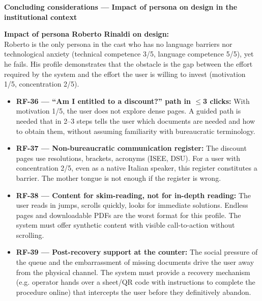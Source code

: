 ﻿\documentclass[11pt,a4paper]{article}
\begin{document}
\begin{tcolorbox}[sectionbox,colback=primaryColor!10]
    \textbf{Concluding considerations --- Impact of persona on design in the institutional context}
\end{tcolorbox}

\vspace{0.3cm}

\begin{tcolorbox}[base]
    {\small
    \textbf{Impact of persona Roberto Rinaldi on design:} \\[4pt]
    Roberto is the only persona in the cast who has no language barriers nor technological anxiety (technical competence 3/5, language competence 5/5), yet he fails. His profile demonstrates that the obstacle is the gap between the effort required by the system and the effort the user is willing to invest (motivation 1/5, concentration 2/5).

    \begin{itemize}[leftmargin=*]
        \item \textbf{RF-36 --- ``Am I entitled to a discount?'' path in $\leq$3 clicks:} With motivation 1/5, the user does not explore dense pages. A guided path is needed that in 2--3 steps tells the user which documents are needed and how to obtain them, without assuming familiarity with bureaucratic terminology.

        \item \textbf{RF-37 --- Non-bureaucratic communication register:} The discount pages use resolutions, brackets, acronyms (ISEE, DSU). For a user with concentration 2/5, even as a native Italian speaker, this register constitutes a barrier. The mother tongue is not enough if the register is wrong.

        \item \textbf{RF-38 --- Content for skim-reading, not for in-depth reading:} The user reads in jumps, scrolls quickly, looks for immediate solutions. Endless pages and downloadable PDFs are the worst format for this profile. The system must offer synthetic content with visible call-to-action without scrolling.

        \item \textbf{RF-39 --- Post-recovery support at the counter:} The social pressure of the queue and the embarrassment of missing documents drive the user away from the physical channel. The system must provide a recovery mechanism (e.g. operator hands over a sheet/QR code with instructions to complete the procedure online) that intercepts the user before they definitively abandon.
    \end{itemize}
    }
\end{tcolorbox}
\end{document}
